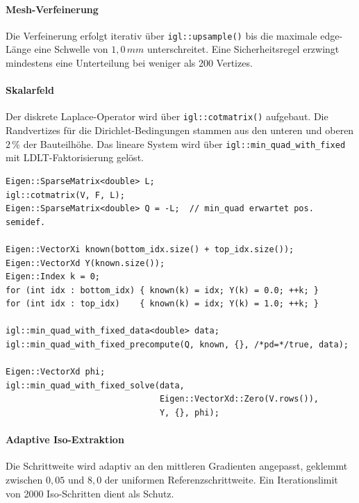                 \paragraph{Mesh-Verfeinerung}\label{para:impl-crystal-mesh-refinement}
                    Die Verfeinerung erfolgt iterativ über \texttt{igl::upsample()} bis die maximale \gls{edge}-Länge eine Schwelle von $1{,}0\,\si{mm}$ unterschreitet.
                    Eine Sicherheitsregel erzwingt mindestens eine Unterteilung bei weniger als 200 Vertizes.

                \paragraph{Skalarfeld}\label{para:impl-crystal-solve}
                    Der diskrete Laplace-Operator wird über \texttt{igl::cotmatrix()} aufgebaut.
                    Die Randvertizes für die Dirichlet-Bedingungen stammen aus den unteren und oberen $2\,\%$ der Bauteilhöhe.
                    Das lineare System wird über \texttt{igl::min\_quad\_with\_fixed} mit LDLT-Faktorisierung gelöst.

                    \begin{lstlisting}[style=cppStyle, caption={Aufbau und Lösung des Skalarfeld-Systems}, label={lst:impl-crystal-solve}]
Eigen::SparseMatrix<double> L;
igl::cotmatrix(V, F, L);
Eigen::SparseMatrix<double> Q = -L;  // min_quad erwartet pos. semidef.

Eigen::VectorXi known(bottom_idx.size() + top_idx.size());
Eigen::VectorXd Y(known.size());
Eigen::Index k = 0;
for (int idx : bottom_idx) { known(k) = idx; Y(k) = 0.0; ++k; }
for (int idx : top_idx)    { known(k) = idx; Y(k) = 1.0; ++k; }

igl::min_quad_with_fixed_data<double> data;
igl::min_quad_with_fixed_precompute(Q, known, {}, /*pd=*/true, data);

Eigen::VectorXd phi;
igl::min_quad_with_fixed_solve(data,
                               Eigen::VectorXd::Zero(V.rows()),
                               Y, {}, phi);
                    \end{lstlisting}

                \paragraph{Adaptive Iso-Extraktion}\label{para:impl-crystal-iso}
                    Die Schrittweite wird adaptiv an den mittleren Gradienten angepasst,
                    geklemmt zwischen $0{,}05$ und $8{,}0$ der uniformen Referenzschrittweite.
                    Ein Iterationslimit von 2000 Iso-Schritten dient als Schutz.


